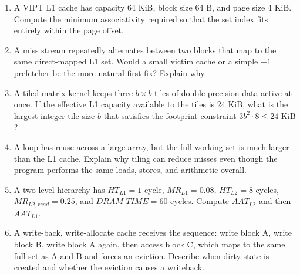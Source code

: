 \begin{enumerate}
    \item A VIPT L1 cache has capacity 64 KiB, block size 64 B, and page size 4 KiB. Compute the minimum associativity required so that the set index fits entirely within the page offset.
    \item A miss stream repeatedly alternates between two blocks that map to the same direct-mapped L1 set.
    Would a small victim cache or a simple $+1$ prefetcher be the more natural first fix?
    Explain why.
    \item A tiled matrix kernel keeps three $b\times b$ tiles of double-precision data active at once.
    If the effective L1 capacity available to the tiles is 24 KiB, what is the largest integer tile size $b$ that satisfies the footprint constraint $3b^2\cdot 8 \le 24\text{ KiB}$?
    \item A loop has reuse across a large array, but the full working set is much larger than the L1 cache.
    Explain why tiling can reduce misses even though the program performs the same loads, stores, and arithmetic overall.
    \item A two-level hierarchy has $HT_{L1}=1$ cycle, $MR_{L1}=0.08$, $HT_{L2}=8$ cycles, $MR_{L2,read}=0.25$, and $DRAM\_TIME=60$ cycles.
    Compute $AAT_{L2}$ and then $AAT_{L1}$.
    \item A write-back, write-allocate cache receives the sequence: write block A, write block B, write block A again, then access block C, which maps to the same full set as A and B and forces an eviction.
    Describe when dirty state is created and whether the eviction causes a writeback.
\end{enumerate}
